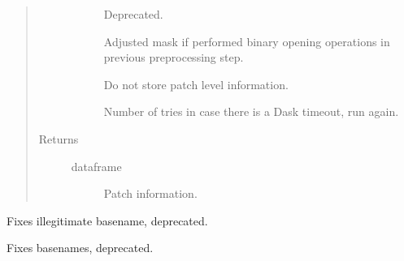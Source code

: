 \documentclass[letterpaper,10pt,english]{sphinxmanual}
\begin{document}
\begin{fulllineitems}
\begin{quote}
\begin{description}
\begin{description}
\item[{}] \leavevmode
Deprecated.

\item[{}] \leavevmode
Adjusted mask if performed binary opening operations in previous preprocessing step.

\item[{}] \leavevmode
Do not store patch level information.

\item[{}] \leavevmode
Number of tries in case there is a Dask timeout, run again.

\end{description}

\item[{Returns}] \leavevmode\begin{description}
\item[{dataframe}] \leavevmode
Patch information.

\end{description}

\end{description}\end{quote}

\end{fulllineitems}


\begin{fulllineitems}
\label{\detokenize{index:pathflowai.utils.fix_name}}
Fixes illegitimate basename, deprecated.

\end{fulllineitems}


\begin{fulllineitems}
\label{\detokenize{index:pathflowai.utils.fix_names}}
Fixes basenames, deprecated.

\end{fulllineitems}
\end{document}
